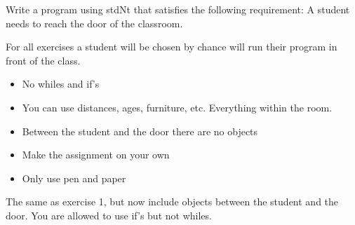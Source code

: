 \documentclass[11pt, a4paper]{article}
\begin{document}
\setcounter{opgave}{1}

Write a program using stdNt that satisfies the following requirement:
A student needs to reach the door of the classroom.


For all exercises a student will be chosen by chance will run their program in front of the class.

\begin{itemize}
    \item No whiles and if’s
    \item You can use distances, ages, furniture, etc. Everything within the room.
    \item Between the student and the door there are no objects
    \item Make the assignment on your own
    \item Only use pen and paper
\end{itemize}

The same as exercise 1, but now include objects between the student and the door. You are allowed to use if’s but not whiles.


\einde
\end{document}
